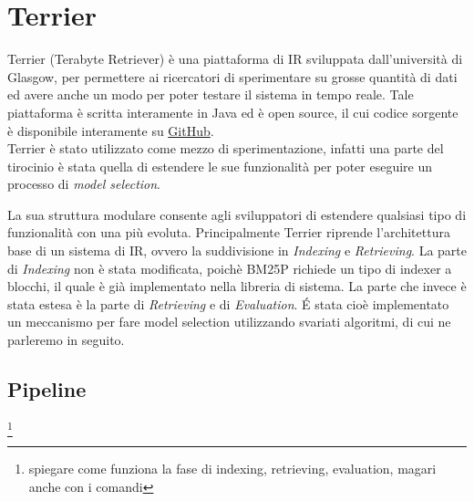 \chapter{Terrier}
Terrier (Terabyte Retriever) è una piattaforma di IR sviluppata dall'università di Glasgow, per permettere ai ricercatori di sperimentare su
grosse quantità di dati ed avere anche un modo per poter testare il sistema in tempo reale.
Tale piattaforma è scritta interamente in Java ed è open source, il cui codice sorgente è disponibile
interamente su \href{https://github.com/terrier-org/terrier-core}{GitHub}.
\\
Terrier è stato utilizzato come mezzo di sperimentazione, infatti
una parte del tirocinio è stata quella di estendere le sue funzionalità per poter eseguire un processo
di \textit{model selection}.

La sua struttura modulare consente agli sviluppatori di estendere qualsiasi tipo di funzionalità con una
più evoluta.
Principalmente Terrier riprende l'architettura base di un sistema di IR, ovvero la suddivisione in
\textit{Indexing} e \textit{Retrieving}. La parte di \textit{Indexing} non è stata modificata, poichè
BM25P richiede un tipo di indexer a blocchi, il quale è già implementato nella libreria di sistema.
La parte che invece è stata estesa è la parte di \textit{Retrieving} e di \textit{Evaluation}. \'E stata
cioè implementato un meccanismo per fare model selection utilizzando svariati algoritmi, di cui
ne parleremo in seguito. 


\section{Pipeline}
\footnote{spiegare come funziona la fase di indexing, retrieving, evaluation, magari anche con i comandi}